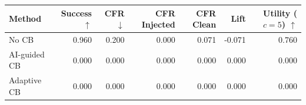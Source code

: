 \begin{tabular}{lrrrrrr}
\toprule
Method & Success $\uparrow$ & CFR $\downarrow$ & CFR Injected & CFR Clean & Lift & Utility ($c=5$) $\uparrow$ \\
\midrule
No CB & 0.960 & 0.200 & 0.000 & 0.071 & -0.071 & 0.760 \\
AI-guided CB & 0.000 & 0.000 & 0.000 & 0.000 & 0.000 & 0.000 \\
Adaptive CB & 0.000 & 0.000 & 0.000 & 0.000 & 0.000 & 0.000 \\
\bottomrule
\end{tabular}

